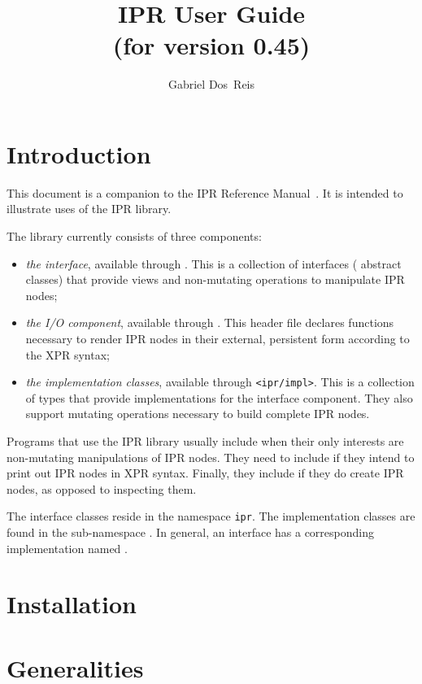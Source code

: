 \documentclass[a4paper,12pt]{article}
\title{IPR User Guide\\{\normalsize (for version 0.45)}}
\author{Gabriel Dos~Reis}
\begin{document}
\maketitle


\section{Introduction}
\label{sec:intro}

This document is a companion to the IPR Reference 
Manual~\cite{dosreis04:ipr-ref}.  It is intended to illustrate uses of the IPR
library.

The library currently consists of three components:
\begin{itemize}
\item \emph{the interface}, available through .  This
  is a collection of interfaces (\ie{} abstract classes) that provide views and
  non-mutating operations to manipulate IPR nodes;
\item \emph{the I/O component}, available through .  This
  header file declares functions necessary to render IPR nodes in their
  external, persistent form according to the XPR syntax;
\item \emph{the implementation classes}, available through
  \texttt{<ipr/impl>}.  This is a collection of types that provide
  implementations for the interface component.  They also support mutating
  operations necessary to build   complete IPR nodes. 
\end{itemize}
Programs that use the IPR library usually include 
when their only interests are non-mutating manipulations of IPR nodes.  They
need to include  if they intend to print out IPR nodes in
XPR syntax.  Finally, they include  if
they do create IPR nodes, as opposed to inspecting them.


The interface classes reside in the namespace \texttt{ipr}.  The
implementation classes are found in the sub-namespace .
In general, an interface  has a corresponding implementation
named . 


\section{Installation}
\label{sec:install}



\section{Generalities}
\label{sec:generalities}
\end{document}
